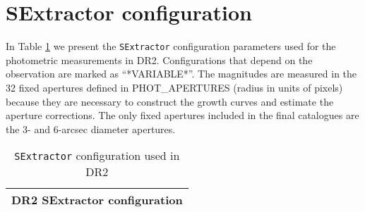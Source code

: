 \documentclass[fleqn,usenatbib]{mnras}
\begin{document}
\section{SExtractor configuration}
\label{ap:SExtractor}

In Table \ref{tab:SEx_config} we present the \texttt{SExtractor} configuration parameters used for the photometric measurements in DR2. Configurations that depend on the observation are marked as ``*VARIABLE*''. The magnitudes are measured in the 32 fixed apertures defined in PHOT\_APERTURES (radius in units of pixels) because they are necessary to construct the growth curves and estimate the aperture corrections. The only fixed apertures included in the final catalogues are the 3- and 6-arcsec diameter apertures.

\begin{table}
\caption{\texttt{SExtractor} configuration used in DR2}
\centering
\label{tab:SEx_config}
\begin{tabular}{rl}
\hline \hline

\multicolumn{2}{c}{DR2 SExtractor configuration} \\ \hline


\end{tabular}
\end{table}
\end{document}
